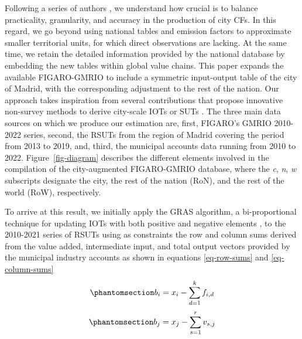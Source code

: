\documentclass[
  10pt,
  twocolumn]{aft}
\begin{document}
Following a series of authors \citep[e.g.][ and
\citet{wiedmann_threescope_2021}]{corcoles_carbon_2024}, we understand
how crucial is to balance practicality, granularity, and accuracy in the
production of city CFs. In this regard, we go beyond using national
tables and emission factors to approximate smaller territorial units,
for which direct observations are lacking. At the same time, we retain
the detailed information provided by the national database by embedding
the new tables within global value chains. This paper expands the
available FIGARO-GMRIO to include a symmetric input-output table of the
city of Madrid, with the corresponding adjustment to the rest of the
nation. Our approach takes inspiration from several contributions that
propose innovative non-survey methods to derive city-scale IOTs or SUTs
\citep[see][]{wiedmann_threescope_2021, moran_carbon_2018, zheng_entropy-based_2022, wiedmann_concept_2016}.
The three main data sources on which we produce our estimation are,
first, FIGARO's GMRIO 2010-2022 series, second, the RSUTs from the
region of Madrid covering the period from 2013 to 2019, and, third, the
municipal accounts data running from 2010 to 2022.
Figure~\ref{fig-diagram} describes the different elements involved in
the compilation of the city-augmented FIGARO-GMRIO database, where the
\textit{c}, \textit{n}, \textit{w} subscripts designate the city, the
rest of the nation (RoN), and the rest of the world (RoW), respectively.

To arrive at this result, we initially apply the GRAS algorithm, a
bi-proportional technique for updating IOTs with both positive and
negative elements
\citep{temurshoev_note_2013, lenzen_comments_2007, junius_solution_2003},
to the 2010-2021 series of RSUTs using as constraints the row and column
sums derived from the value added, intermediate input, and total output
vectors provided by the municipal industry accounts as shown in
equations \ref{eq-row-sums} and \ref{eq-column-sums} \vspace{-3pt}
\begin{equation}\phantomsection\label{eq-row-sums}{ b_i = x_i - \sum^k_{d=1} f_{i,d} }\end{equation}
\begin{equation}\phantomsection\label{eq-column-sums}{ b_j = x_j - \sum^r_{s=1} v_{s,j} }\end{equation}
\end{document}
